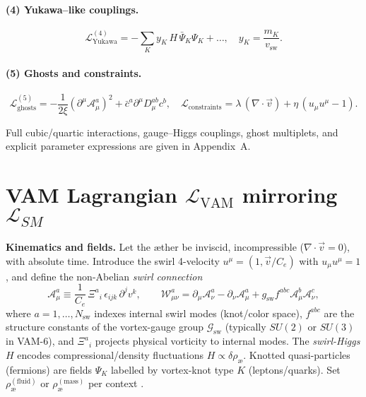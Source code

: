 \documentclass[11pt]{article}
\begin{document}
        \paragraph{(4) Yukawa–like couplings.}
        \begin{equation}
            \mathcal{L}^{(4)}_{\mathrm{Yukawa}}
            = -\sum_K y_K\, H\, \bar{\Psi}_K\Psi_K + \dots,
            \quad y_K = \frac{m_K}{v_{\mathrm{sw}}}.
        \end{equation}

        \paragraph{(5) Ghosts and constraints.}
        \begin{equation}
            \mathcal{L}^{(5)}_{\mathrm{ghosts}}
            = -\frac{1}{2\xi}(\partial^\mu \mathcal{A}^a_\mu)^2 + \bar{c}^a\partial^\mu D_\mu^{ab} c^b,
            \quad
            \mathcal{L}_{\mathrm{constraints}}
            = \lambda\,(\nabla\!\cdot\!\vec v) + \eta\,(u_\mu u^\mu - 1).
        \end{equation}

        \bigskip
        Full cubic/quartic interactions, gauge–Higgs couplings, ghost multiplets, and explicit parameter expressions are given in Appendix~A.






    \section*{VAM Lagrangian \(\mathcal{L}_\text{VAM}\) mirroring \(\mathcal{L}_{SM}\)}

    \noindent\textbf{Kinematics and fields.}
    Let the æther be inviscid, incompressible (\(\nabla\!\cdot\!\vec v=0\)), with absolute time.
    Introduce the swirl 4-velocity \(u^\mu=(1,\vec v/C_e)\) with \(u_\mu u^\mu=1\), and define the non-Abelian \emph{swirl connection}
    \[
        \mathcal{A}_\mu^a \equiv \frac{1}{C_e}\, \Xi^{a}{}_{i}\, \epsilon_{ijk}\,\partial^j v^k,
        \qquad
        \mathcal{W}_{\mu\nu}^a=\partial_\mu \mathcal{A}_\nu^a-\partial_\nu \mathcal{A}_\mu^a
        + g_\text{sw} f^{abc} \mathcal{A}_\mu^b \mathcal{A}_\nu^c,
    \]
    where \(a=1,\dots,N_\text{sw}\) indexes internal swirl modes (knot/color space), \(f^{abc}\) are the structure constants of the vortex-gauge group \(\mathcal{G}_\text{sw}\) (typically \(SU(2)\) or \(SU(3)\) in VAM-6), and \(\Xi^{a}{}_{i}\) projects physical vorticity to internal modes.
    The \emph{swirl-Higgs} \(H\) encodes compressional/density fluctuations \(H\propto \delta\rho_\text{\ae}\).
    Knotted quasi-particles (fermions) are fields \(\Psi_K\) labelled by vortex-knot type \(K\) (leptons/quarks).
    Set \(\rho_\text{\ae}^{(\text{fluid})}\) or \(\rho_\text{\ae}^{(\text{mass})}\) per context \cite{Iskandarani2025TimeDilation,Iskandarani2025SwirlClocks}.
\end{document}

